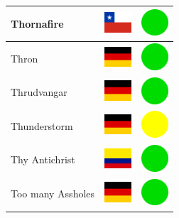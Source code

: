 \documentclass[12pt, a4paper, twoside]{report}
\begin{document}
\begin{center}
\begin{longtable}{|p{5cm}|p{2cm}|p{2cm}|}
Thornafire & \includegraphics[width=1cm]{4x3/cl} & \includegraphics[width=1cm]{likes/y} \\ \hline
Thron & \includegraphics[width=1cm]{4x3/de} & \includegraphics[width=1cm]{likes/y} \\ \hline
Thrudvangar & \includegraphics[width=1cm]{4x3/de} & \includegraphics[width=1cm]{likes/y} \\ \hline
Thunderstorm & \includegraphics[width=1cm]{4x3/de} & \includegraphics[width=1cm]{likes/m} \\ \hline
Thy Antichrist & \includegraphics[width=1cm]{4x3/co} & \includegraphics[width=1cm]{likes/y} \\ \hline
Too many Assholes & \includegraphics[width=1cm]{4x3/de} & \includegraphics[width=1cm]{likes/y} \\ \hline

\end{longtable}
\end{center}
\end{document}
